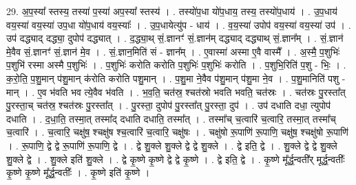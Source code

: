 \documentclass[17pt]{extarticle}
\begin{document}
29. अ॒प॒स्या᳚ स्तस्य॒ तस्या॑ प॒स्या॑ अप॒स्या᳚ स्तस्य॑ । . तस्यो॑प॒धा यो॑प॒धाय॒ तस्य॒ तस्यो॑प॒धाय॑ । . उ॒प॒धाय॑ वय॒स्या॑ वय॒स्या॑ उप॒धा यो॑प॒धाय॑ वय॒स्याः᳚ । . उ॒प॒धायेत्यु॑प - धाय॑ । . व॒य॒स्या॑ उपोप॑ वय॒स्या॑ वय॒स्या॑ उप॑ । . उप॑ दद्ध्याद् दद्ध्या॒ दुपोप॑ दद्ध्यात् । . द॒द्ध्या॒थ् सं॒.ज्ञानꣳ॑ सं॒.ज्ञान॑म् दद्ध्याद् दद्ध्याथ् सं॒.ज्ञान᳚म् । . सं॒.ज्ञान॑ मे॒वैव सं॒.ज्ञानꣳ॑ सं॒.ज्ञान॑ मे॒व । . सं॒.ज्ञान॒मिति॑ सं - ज्ञान᳚म् । . ए॒वास्मा॑ अस्मा ए॒वै वास्मै᳚ । . अ॒स्मै॒ प॒शुभिः॑ प॒शुभि॑ रस्मा अस्मै प॒शुभिः॑ । . प॒शुभिः॑ करोति करोति प॒शुभिः॑ प॒शुभिः॑ करोति । . प॒शुभि॒रिति॑ प॒शु - भिः॒ । . क॒रो॒ति॒ प॒शु॒मान् प॑शु॒मान् क॑रोति करोति पशु॒मान् । . प॒शु॒मा ने॒वैव प॑शु॒मान् प॑शु॒मा ने॒व । . प॒शु॒मानिति॑ पशु - मान् । . ए॒व भ॑वति भव त्ये॒वैव भ॑वति । . भ॒व॒ति॒ चत॑स्र॒ श्चत॑स्रो भवति भवति॒ चत॑स्रः । . चत॑स्रः पु॒रस्ता᳚त् पु॒रस्ता॒च् चत॑स्र॒ श्चत॑स्रः पु॒रस्ता᳚त् । . पु॒रस्ता॒ दुपोप॑ पु॒रस्ता᳚त् पु॒रस्ता॒ दुप॑ । . उप॑ दधाति दधा॒ त्युपोप॑ दधाति । . द॒धा॒ति॒ तस्मा॒त् तस्मा᳚द् दधाति दधाति॒ तस्मा᳚त् । . तस्मा᳚च् च॒त्वारि॑ च॒त्वारि॒ तस्मा॒त् तस्मा᳚च् च॒त्वारि॑ । . च॒त्वारि॒ चक्षु॑ष॒ श्चक्षु॑ष श्च॒त्वारि॑ च॒त्वारि॒ चक्षु॑षः । . चक्षु॑षो रू॒पाणि॑ रू॒पाणि॒ चक्षु॑ष॒ श्चक्षु॑षो रू॒पाणि॑ । . रू॒पाणि॒ द्वे द्वे रू॒पाणि॑ रू॒पाणि॒ द्वे । . द्वे शु॒क्ले शु॒क्ले द्वे द्वे शु॒क्ले । . द्वे इति॒ द्वे । . शु॒क्ले द्वे द्वे शु॒क्ले शु॒क्ले द्वे । . शु॒क्ले इति॑ शु॒क्ले । . द्वे कृ॒ष्णे कृ॒ष्णे द्वे द्वे कृ॒ष्णे । . द्वे इति॒ द्वे । . कृ॒ष्णे मू᳚र्द्ध॒न्वती᳚र् मूर्द्ध॒न्वतीः᳚ कृ॒ष्णे कृ॒ष्णे मू᳚र्द्ध॒न्वतीः᳚ । . कृ॒ष्णे इति॑ कृ॒ष्णे । \newline
\end{document}
